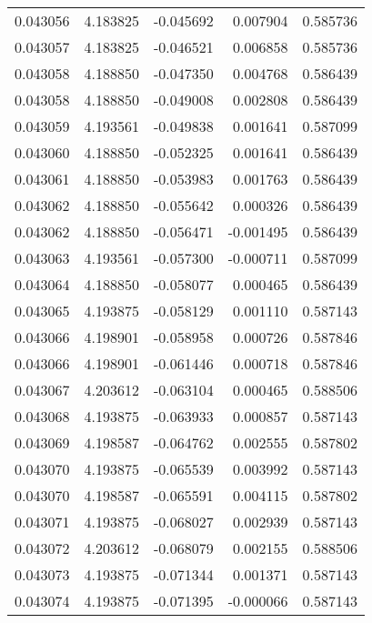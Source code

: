 \begin{tabular}{lrrrr}
0.043056    &  4.183825 & -0.045692 &  0.007904 &             0.585736 \\
0.043057    &  4.183825 & -0.046521 &  0.006858 &             0.585736 \\
0.043058    &  4.188850 & -0.047350 &  0.004768 &             0.586439 \\
0.043058    &  4.188850 & -0.049008 &  0.002808 &             0.586439 \\
0.043059    &  4.193561 & -0.049838 &  0.001641 &             0.587099 \\
0.043060    &  4.188850 & -0.052325 &  0.001641 &             0.586439 \\
0.043061    &  4.188850 & -0.053983 &  0.001763 &             0.586439 \\
0.043062    &  4.188850 & -0.055642 &  0.000326 &             0.586439 \\
0.043062    &  4.188850 & -0.056471 & -0.001495 &             0.586439 \\
0.043063    &  4.193561 & -0.057300 & -0.000711 &             0.587099 \\
0.043064    &  4.188850 & -0.058077 &  0.000465 &             0.586439 \\
0.043065    &  4.193875 & -0.058129 &  0.001110 &             0.587143 \\
0.043066    &  4.198901 & -0.058958 &  0.000726 &             0.587846 \\
0.043066    &  4.198901 & -0.061446 &  0.000718 &             0.587846 \\
0.043067    &  4.203612 & -0.063104 &  0.000465 &             0.588506 \\
0.043068    &  4.193875 & -0.063933 &  0.000857 &             0.587143 \\
0.043069    &  4.198587 & -0.064762 &  0.002555 &             0.587802 \\
0.043070    &  4.193875 & -0.065539 &  0.003992 &             0.587143 \\
0.043070    &  4.198587 & -0.065591 &  0.004115 &             0.587802 \\
0.043071    &  4.193875 & -0.068027 &  0.002939 &             0.587143 \\
0.043072    &  4.203612 & -0.068079 &  0.002155 &             0.588506 \\
0.043073    &  4.193875 & -0.071344 &  0.001371 &             0.587143 \\
0.043074    &  4.193875 & -0.071395 & -0.000066 &             0.587143 \\

\end{tabular}
